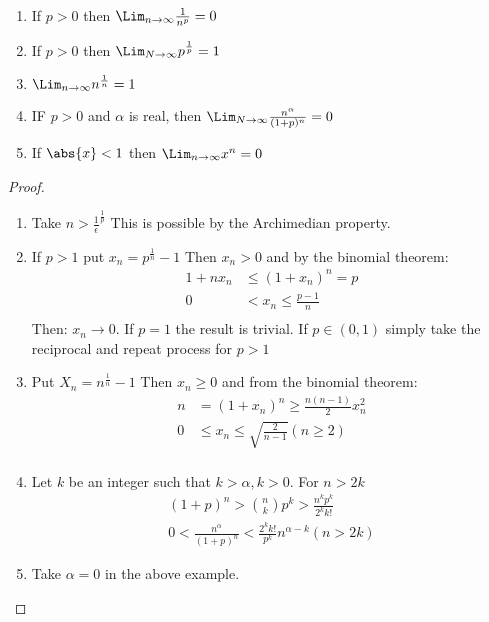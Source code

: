 \documentclass[12pt, letterpaper]{paper}
\begin{document}
\begin{theorem}
  \label{thr:3.20}
  \begin{enumerate}
  \item If $p > 0$ then $\Lim_{n\to\infty} \frac{1}{n^p} = 0$
  \item If $p > 0$ then $\Lim_{N\to\infty} p^{\frac{1}{p}} = 1$
  \item $\Lim_{n \to\infty} n^{\frac{1}{n}} = 1$
  \item IF $p > 0$ and $\alpha$ is real, then
    $\Lim_{N\to\infty} \frac{n^{\alpha}}{(1+p)^n} = 0$
  \item If $\abs{x} < 1$ then $\Lim_{n\to\infty} x^n = 0$
  \end{enumerate}
\end{theorem}
\begin{proof}
  \begin{enumerate}
  \item Take $n > \frac{1}{\epsilon}^{\frac{1}{p}}$ This is possible
    by the Archimedian property.
  \item If $p > 1$ put $x_n = p^{\frac{1}{n}} -1$ Then $x_n > 0$ and
    by the binomial theorem:
    \begin{align*}
      1 + nx_n &\leq (1+x_n)^n = p\\
      0 &< x_n \leq \frac{p-1}{n}\\
    \end{align*}
    Then: $x_n \to 0$. If $p = 1$ the result is trivial. If
    $p \in (0,1)$ simply take the reciprocal and repeat process for
    $p > 1$
  \item Put $X_n = n^{\frac{1}{n}} - 1$ Then $x_n \geq 0$ and from the
    binomial theorem:
    \begin{align*}
      n &= (1+x_n)^n \geq \frac{n(n-1)}{2} x_n^2\\
      0 &\leq x_n \leq \sqrt{ \frac{2}{n-1}} (n \geq 2 )\\
    \end{align*}
  \item Let $k$ be an integer such that $k > \alpha, k > 0$. For
    $n > 2k$
    \begin{align*}
      (1+p)^n > \binom{n}{k} p^k > \frac{n^kp^k}{2^kk!}\\
      0 < \frac{n^{\alpha}}{(1+p)^n} < \frac{2^k k!}{p^k} n^{\alpha-k} (n > 2k)
    \end{align*}
  \item Take $\alpha = 0$ in the above example.
  \end{enumerate}
\end{proof}
\end{document}

